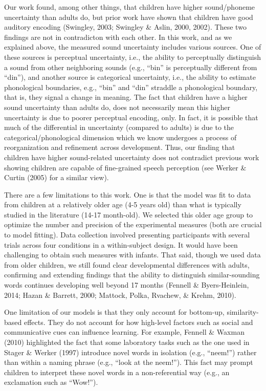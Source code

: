 \documentclass[english,,man]{apa6}
\begin{document}
Our work found, among other things, that children have higher sound/phoneme uncertainty than adults do, but prior work have shown that children have good auditory encoding (Swingley, 2003; Swingley \& Aslin, 2000, 2002). These two findings are not in contradicton with each other. In this work, and as we explained above, the measured sound uncertainty includes various sources. One of these sources is perceptual uncertainty, i.e., the ability to perceptually distinguish a sound from other neighboring sounds (e.g., \enquote{bin} is perceptually different from \enquote{din}), and another source is categorical uncertainty, i.e., the ability to estimate phonological boundaries, e.g., \enquote{bin} and \enquote{din} straddle a phonological boundary, that is, they signal a change in meaning. The fact that children have a higher sound uncertainty than adults do, does not necessarily mean this higher uncertainty is due to poorer perceptual encoding, only. In fact, it is possible that much of the differential in uncertainty (compared to adults) is due to the categorical/phonological dimension which we know undergoes a process of reorganization and refinement across development. Thus, our finding that children have higher sound-related uncertainty does not contradict previous work showing children are capable of fine-grained speech perception (see Werker \& Curtin (2005) for a similar view).

There are a few limitations to this work. One is that the model was fit to data from children at a relatively older age (4-5 years old) than what is typically studied in the literature (14-17 month-old). We selected this older age group to optimize the number and precision of the experimental measures (both are crucial to model fitting). Data collection involved presenting participants with several trials across four conditions in a within-subject design. It would have been challenging to obtain such measures with infants. That said, though we used data from older children, we still found clear developmental differences with adults, confirming and extending findings that the ability to distinguish similar-sounding words continues developing well beyond 17 months (Fennell \& Byers-Heinlein, 2014; Hazan \& Barrett, 2000; Mattock, Polka, Rvachew, \& Krehm, 2010).

One limitation of our models is that they only account for bottom-up, similarity-based effects. They do not account for how high-level factors such as social and communicative cues can influence learning. For example, Fennell \& Waxman (2010) highlighted the fact that some laboratory tasks such as the one used in Stager \& Werker (1997) introduce novel words in isolation (e.g., \enquote{neem!}) rather than within a naming phrase (e.g., \enquote{look at the neem!}). This fact may prompt children to interpret these novel words in a non-referential way (e.g., an exclamation such as \enquote{Wow!}).
\end{document}
